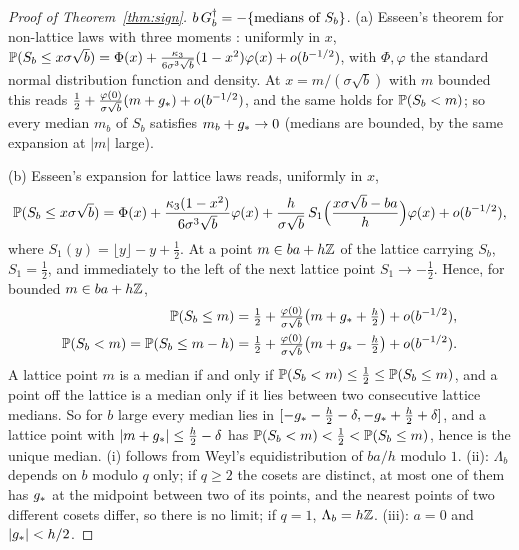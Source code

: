 \begin{proof}[Proof of Theorem~\ref{thm:sign}]
$b\,G^\dagger_b=-\{\text{medians of }S_b\}$. \textup{(a)} Esseen's theorem for non-lattice laws with three moments
\citep{esseen,gk}: uniformly in $x$,
$\mathbb{P}(S_b\le x\sigma\sqrt b)=\Phi(x)+\frac{\kappa_3}{6\sigma^3\sqrt b}(1-x^2)\varphi(x)+o(b^{-1/2})$, with $\Phi,\varphi$
the standard normal distribution function and density. At $x=m/(\sigma\sqrt b)$ with $m$ bounded this reads
$\frac12+\frac{\varphi(0)}{\sigma\sqrt b}(m+g_\ast)+o(b^{-1/2})$, and the same holds for $\mathbb{P}(S_b<m)$; so every
median $m_b$ of $S_b$ satisfies $m_b+g_\ast\to0$ (medians are bounded, by the same expansion at $|m|$ large).

\textup{(b)} Esseen's expansion for lattice laws \citep[\S43]{gk} reads, uniformly in $x$,
\[
\mathbb{P}(S_b\le x\sigma\sqrt b)=\Phi(x)+\frac{\kappa_3(1-x^2)}{6\sigma^3\sqrt b}\varphi(x)+\frac h{\sigma\sqrt b}\,
S_1\Big(\frac{x\sigma\sqrt b-ba}{h}\Big)\varphi(x)+o(b^{-1/2}),
\]
where $S_1(y)=\lfloor y\rfloor-y+\tfrac12$.
At a point $m\in ba+h\mathbb{Z}$ of the lattice carrying $S_b$, $S_1=\frac12$, and immediately to the left of the next lattice
point $S_1\to-\frac12$. Hence, for bounded $m\in ba+h\mathbb{Z}$,
\begin{align*}
\mathbb{P}(S_b\le m)&=\tfrac12+\tfrac{\varphi(0)}{\sigma\sqrt b}\big(m+g_\ast+\tfrac h2\big)+o(b^{-1/2}),\\
\mathbb{P}(S_b<m)=\mathbb{P}(S_b\le m-h)&=\tfrac12+\tfrac{\varphi(0)}{\sigma\sqrt b}\big(m+g_\ast-\tfrac h2\big)+o(b^{-1/2}).
\end{align*}
A lattice point $m$ is a median if and only if $\mathbb{P}(S_b<m)\le\frac12\le\mathbb{P}(S_b\le m)$, and a point off the lattice
is a median only if it lies between two consecutive lattice medians. So for $b$ large every median lies in
$[-g_\ast-\frac h2-\delta,-g_\ast+\frac h2+\delta]$, and a lattice point with $|m+g_\ast|\le\frac h2-\delta$ has
$\mathbb{P}(S_b<m)<\frac12<\mathbb{P}(S_b\le m)$, hence is the unique median. \textup{(i)} follows from Weyl's
equidistribution of $ba/h$ modulo $1$. \textup{(ii)}: $\Lambda_b$ depends on $b$ modulo $q$ only; if $q\ge2$ the cosets
are distinct, at most one of them has $g_\ast$ at the midpoint between two of its points, and the nearest points of two
different cosets differ, so there is no limit; if $q=1$, $\Lambda_b=h\mathbb{Z}$. \textup{(iii)}: $a=0$ and $|g_\ast|<h/2$.
\end{proof}
